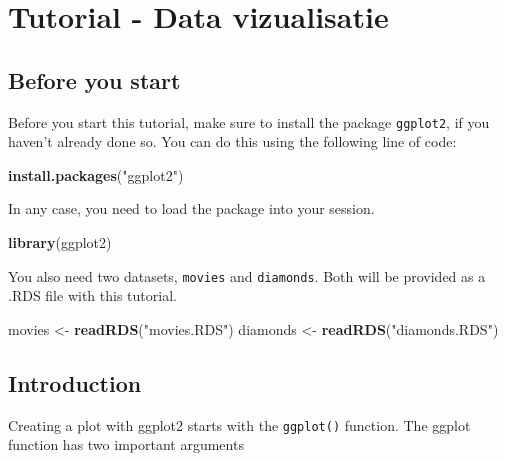 \documentclass[]{tufte-book}
\newenvironment{Shaded}{}{}
\newcommand{\KeywordTok}[1]{\textcolor[rgb]{0.00,0.44,0.13}{\textbf{#1}}}
\newcommand{\NormalTok}[1]{#1}
\newcommand{\StringTok}[1]{\textcolor[rgb]{0.25,0.44,0.63}{#1}}
\begin{document}
\hypertarget{tutorial---data-vizualisatie}{%
\chapter{Tutorial - Data vizualisatie}\label{tutorial---data-vizualisatie}}

\hypertarget{before-you-start}{%
\section{Before you start}\label{before-you-start}}

Before you start this tutorial, make sure to install the package \texttt{ggplot2}, if you haven't already done so. You can do this using the following line of code:

\begin{Shaded}
\begin{Highlighting}[]
\KeywordTok{install.packages}\NormalTok{(}\StringTok{"ggplot2"}\NormalTok{)}
\end{Highlighting}
\end{Shaded}

In any case, you need to load the package into your session.

\begin{Shaded}
\begin{Highlighting}[]
\KeywordTok{library}\NormalTok{(ggplot2)}
\end{Highlighting}
\end{Shaded}

You also need two datasets, \texttt{movies} and \texttt{diamonds}. Both will be provided as a .RDS file with this tutorial.

\begin{Shaded}
\begin{Highlighting}[]
\NormalTok{movies <-}\StringTok{ }\KeywordTok{readRDS}\NormalTok{(}\StringTok{"movies.RDS"}\NormalTok{)}
\NormalTok{diamonds <-}\StringTok{ }\KeywordTok{readRDS}\NormalTok{(}\StringTok{"diamonds.RDS"}\NormalTok{)}
\end{Highlighting}
\end{Shaded}

\hypertarget{introduction}{%
\section{Introduction}\label{introduction}}

Creating a plot with ggplot2 starts with the \texttt{ggplot()} function. The ggplot function has two important arguments
\end{document}
